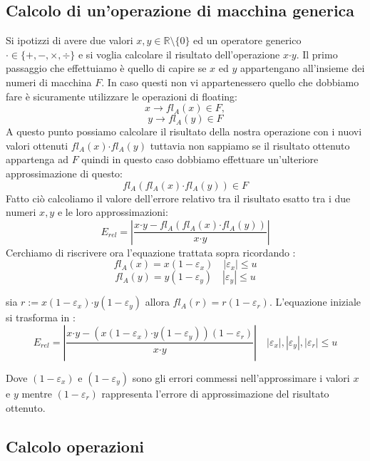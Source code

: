 \documentclass[12pt, a4paper]{book}
\theoremstyle{definition}
\begin{document}
\subsection{ Calcolo di un'operazione di macchina generica}
\begin{flushleft}
Si ipotizzi di avere due valori $x,y \in \mathbb{R} \setminus \{ 0 \}$ ed un operatore generico $\boldsymbol{\cdot} \in \{ + ,  -,  \times,  \div\}$ e si voglia calcolare il risultato dell'operazione $x \boldsymbol{\cdot}  y$.
Il primo passaggio che effettuiamo è quello di capire se $x$ ed $y$ appartengano all'insieme dei numeri di macchina $F$. 
In caso questi non vi appartenessero quello che dobbiamo fare è sicuramente utilizzare le operazioni di floating: 
\[ x \longrightarrow fl_{A}(x) \in F, \]
\[y \longrightarrow fl_{A}(y) \in F \]
A questo punto possiamo calcolare il risultato della nostra operazione con i nuovi valori ottenuti $fl_{A}(x) \boldsymbol{\cdot}  fl_{A}(y)$ tuttavia non sappiamo se il risultato ottenuto appartenga ad $F$ quindi in questo caso dobbiamo effettuare un'ulteriore approssimazione di questo: 
\[ fl_{A}(fl_{A}(x) \boldsymbol{\cdot}  fl_{A}(y)) \in F \]
Fatto ciò calcoliamo il valore dell'errore relativo tra il risultato esatto tra i due numeri $x,y$ e le loro approssimazioni: 
 \[E_{rel} =  \displaystyle\left\lvert \frac{x \boldsymbol{\cdot} y - fl_{A}(fl_{A}(x) \boldsymbol{\cdot}  fl_{A}(y)) }{x \boldsymbol{\cdot} y} \right\rvert\]
Cerchiamo di riscrivere ora l'equazione trattata sopra ricordando : 
\[ fl_{A}(x) = x(1 - \varepsilon_{x}) \quad |\varepsilon_{x}| \leq u \]
\[ fl_{A}(y) = y(1 - \varepsilon_{y}) \quad |\varepsilon_{y}| \leq u \]

sia $r :=  x(1 - \varepsilon_{x})\boldsymbol{\cdot}  y(1 - \varepsilon_{y}) $ allora $fl_{A}(r) = r(1-\varepsilon_{r})$.  L'equazione iniziale si trasforma in :
\[E_{rel} =  \displaystyle\left\lvert \frac{x \boldsymbol{\cdot} y - (x(1 - \varepsilon_{x})\boldsymbol{\cdot}  y(1 - \varepsilon_{y}))(1-\varepsilon_{r})}{x \boldsymbol{\cdot} y} \right\rvert \quad |\varepsilon_{x}|, |\varepsilon_{y}|, |\varepsilon_{r}| \leq u\]

Dove $(1-\varepsilon_{x})$ e $(1 - \varepsilon_{y})$ sono gli errori commessi nell'approssimare i valori $x$ e $y$ mentre $(1 - \varepsilon_{r})$ rappresenta l'errore di approssimazione del risultato ottenuto.
\end{flushleft}

\subsection{Calcolo operazioni}
\end{document}
